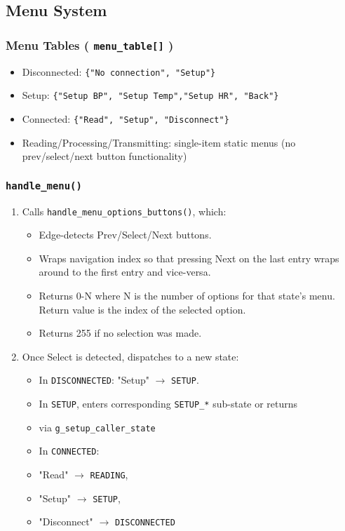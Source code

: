 \subsection{Menu System}
\subsubsection{Menu Tables ( \lstinline|menu_table[]| )}
\begin{itemize}
	\item Disconnected: \lstinline|{"No connection", "Setup"}|
	\item Setup: \lstinline|{"Setup BP", "Setup Temp","Setup HR", "Back"}|
	\item Connected: \lstinline|{"Read", "Setup", "Disconnect"}|
	\item Reading/Processing/Transmitting: single-item static menus (no prev/select/next button functionality)
\end{itemize}

\subsubsection{\lstinline|handle_menu()|}
\begin{enumerate}
	\item Calls \lstinline|handle_menu_options_buttons()|, which:
	\begin{itemize}
		\item Edge-detects Prev/Select/Next buttons.
		\item Wraps navigation index so that pressing Next on the last entry wraps around to the first entry and vice-versa.
		\item Returns 0-N where N is the number of options for that state's menu. Return value is the index of the selected option.
		\item Returns 255 if no selection was made.
	\end{itemize}
	\item Once Select is detected, dispatches to a new state:
	\begin{itemize}
		\item In \lstinline|DISCONNECTED|: "Setup" $\rightarrow$ \lstinline|SETUP|.
		\item In \lstinline|SETUP|, enters corresponding \lstinline|SETUP_*| sub-state or returns
		\item[] via \lstinline|g_setup_caller_state|
		\item In \lstinline|CONNECTED|:
		\item[] "Read" $\rightarrow$ \lstinline|READING|,
		\item[] "Setup" $\rightarrow$ \lstinline|SETUP|,
		\item[] "Disconnect" $\rightarrow$ \lstinline|DISCONNECTED|
	\end{itemize}
\end{enumerate}

